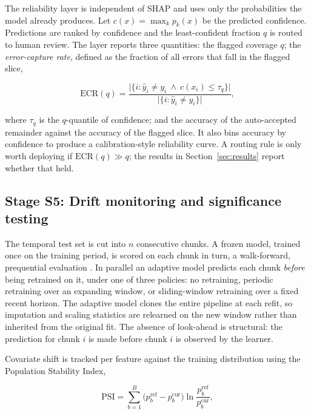 \documentclass{ieeeaccess}
\begin{document}
The reliability layer is independent of SHAP and uses only the probabilities the model already produces. Let $c(x) = \max_k p_k(x)$ be the predicted confidence. Predictions are ranked by confidence and the least-confident fraction $q$ is routed to human review. The layer reports three quantities: the flagged coverage $q$; the \emph{error-capture rate}, defined as the fraction of all errors that fall in the flagged slice,

\begin{equation}
\mathrm{ECR}(q) = \frac{\bigl|\{i : \hat{y}_i \ne y_i \ \wedge\ c(x_i) \le \tau_q\}\bigr|}{\bigl|\{i : \hat{y}_i \ne y_i\}\bigr|},
\label{eq:ecr}
\end{equation}

where $\tau_q$ is the $q$-quantile of confidence; and the accuracy of the auto-accepted remainder against the accuracy of the flagged slice. It also bins accuracy by confidence to produce a calibration-style reliability curve. A routing rule is only worth deploying if $\mathrm{ECR}(q) \gg q$; the results in Section~\ref{sec:results} report whether that held.

\subsection{Stage S5: Drift monitoring and significance testing}
The temporal test set is cut into $n$ consecutive chunks. A frozen model, trained once on the training period, is scored on each chunk in turn, a walk-forward, prequential evaluation \cite{gama2014survey}. In parallel an adaptive model predicts each chunk \emph{before} being retrained on it, under one of three policies: no retraining, periodic retraining over an expanding window, or sliding-window retraining over a fixed recent horizon. The adaptive model clones the entire pipeline at each refit, so imputation and scaling statistics are relearned on the new window rather than inherited from the original fit. The absence of look-ahead is structural: the prediction for chunk $i$ is made before chunk $i$ is observed by the learner.

Covariate shift is tracked per feature against the training distribution using the Population Stability Index,

\begin{equation}
\mathrm{PSI} = \sum_{b=1}^{B}\bigl(p_b^{\text{ref}} - p_b^{\text{cur}}\bigr)\ln\!\frac{p_b^{\text{ref}}}{p_b^{\text{cur}}},
\label{eq:psi}
\end{equation}
\end{document}
